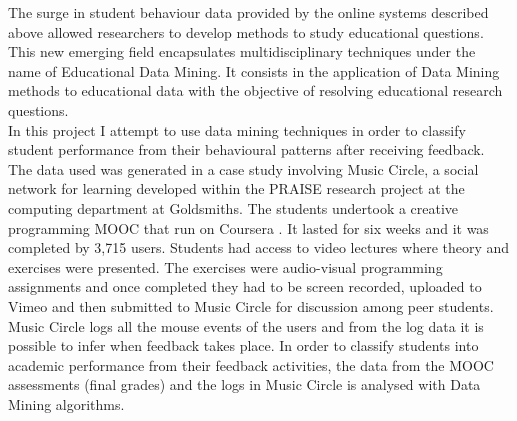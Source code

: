\documentclass[11pt, oneside]{article}   	%
\begin{document}
The surge in student behaviour data provided by the online systems described above allowed researchers to develop methods to study educational questions. This new emerging field encapsulates multidisciplinary techniques under the name of Educational Data Mining. It consists in the application of Data Mining methods to educational data with the objective of resolving educational research questions.\\
In this project I attempt to use data mining techniques in order to classify student performance from their behavioural patterns after receiving feedback. The data used was generated in a case study involving Music Circle, a social network for learning developed within the PRAISE research project at the computing department at Goldsmiths. The students undertook a creative programming MOOC that run on Coursera \cite{Coursera}. It lasted for six weeks and it was completed by 3,715 users. Students had access to video lectures where theory and exercises were presented. The exercises were audio-visual programming assignments and once completed they had to be screen recorded, uploaded to Vimeo and then submitted to Music Circle for discussion among peer students. Music Circle logs all the mouse events of the users and from the log data it is possible to infer when feedback takes place. In order to classify students into academic performance from their feedback activities, the data from the MOOC assessments (final grades) and the logs in Music Circle is analysed with Data Mining algorithms.
\end{document}
